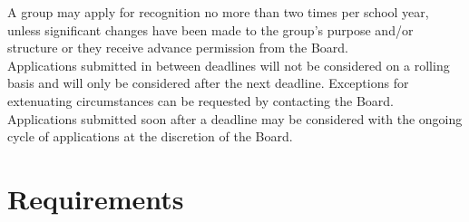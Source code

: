 \documentclass[12pt]{article}
\begin{document}
A group may apply for recognition no more than two times per school year, unless significant changes
    have been made to the group's purpose and/or structure or they receive advance permission from the
    Board.
\\

Applications submitted in between deadlines will not be considered on a rolling basis and will only be
    considered after the next deadline.
Exceptions for extenuating circumstances can be requested by contacting the Board.
Applications submitted soon after a deadline may be considered with the ongoing cycle of applications at
    the discretion of the Board.

\section{Requirements}
\end{document}
